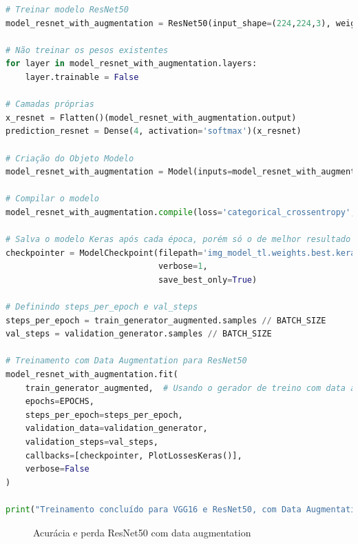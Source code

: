 \begin{lstlisting}[language=Python, style=input]
# Treinar modelo ResNet50
model_resnet_with_augmentation = ResNet50(input_shape=(224,224,3), weights='imagenet', include_top=False)

# Não treinar os pesos existentes
for layer in model_resnet_with_augmentation.layers:
    layer.trainable = False

# Camadas próprias
x_resnet = Flatten()(model_resnet_with_augmentation.output)
prediction_resnet = Dense(4, activation='softmax')(x_resnet)

# Criação do Objeto Modelo
model_resnet_with_augmentation = Model(inputs=model_resnet_with_augmentation.input, outputs=prediction_resnet)

# Compilar o modelo
model_resnet_with_augmentation.compile(loss='categorical_crossentropy', optimizer=RMSprop(learning_rate=0.0001), metrics=['accuracy'])

# Salva o modelo Keras após cada época, porém só o de melhor resultado
checkpointer = ModelCheckpoint(filepath='img_model_tl.weights.best.keras',
                               verbose=1,
                               save_best_only=True)

# Definindo steps_per_epoch e val_steps
steps_per_epoch = train_generator_augmented.samples // BATCH_SIZE
val_steps = validation_generator.samples // BATCH_SIZE

# Treinamento com Data Augmentation para ResNet50
model_resnet_with_augmentation.fit(
    train_generator_augmented,  # Usando o gerador de treino com data augmentation
    epochs=EPOCHS,
    steps_per_epoch=steps_per_epoch,
    validation_data=validation_generator,
    validation_steps=val_steps,
    callbacks=[checkpointer, PlotLossesKeras()],
    verbose=False
)

print("Treinamento concluído para VGG16 e ResNet50, com Data Augmentation.")
\end{lstlisting}
\begin{figure}[h!]
\centering
\hspace*{-2cm} %
\caption{Acurácia e perda ResNet50 com data augmentation}
\end{figure}

